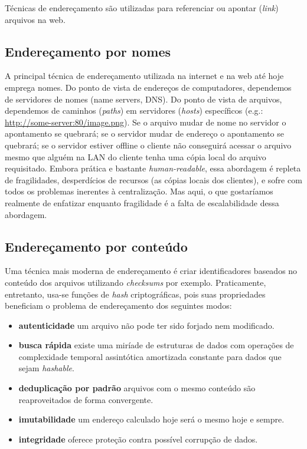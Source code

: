 Técnicas de endereçamento são utilizadas para referenciar ou apontar (\textit{link}) arquivos na web.

\subsection{Endereçamento por nomes}

A principal técnica de endereçamento utilizada na internet e na web até hoje emprega nomes.
Do ponto de vista de endereços de computadores, dependemos de servidores de nomes (name servers, DNS).
Do ponto de vista de arquivos, dependemos de caminhos (\textit{paths}) em servidores (\textit{hosts}) específicos (e.g.: \url{http://some-server:80/image.png}).
Se o arquivo mudar de nome no servidor o apontamento se quebrará; se o servidor mudar de endereço o apontamento se quebrará; se o servidor estiver offline o cliente não conseguirá acessar o arquivo mesmo que alguém na LAN do cliente tenha uma cópia local do arquivo requisitado.
Embora prática e bastante \textit{human-readable}, essa abordagem é repleta de fragilidades, desperdícios de recursos (as cópias locais dos clientes), e sofre com todos os problemas inerentes à centralização. Mas aqui, o que gostaríamos realmente de enfatizar enquanto fragilidade é a falta de escalabilidade dessa abordagem.

\subsection{Endereçamento por conteúdo}

Uma técnica mais moderna de endereçamento é criar identificadores baseados no conteúdo dos arquivos utilizando \textit{checksums} por exemplo.
Praticamente, entretanto, usa-se funções de \textit{hash} criptográficas, pois suas propriedades beneficiam o problema de endereçamento dos seguintes modos:
\begin{itemize}
    \item \textbf{autenticidade} um arquivo não pode ter sido forjado nem modificado.
    \item \textbf{busca rápida} existe uma miríade de estruturas de dados com operações de complexidade temporal assintótica amortizada constante para dados que sejam \textit{hashable}. 
    \item \textbf{deduplicação por padrão} arquivos com o mesmo conteúdo são reaproveitados de forma convergente.
    \item \textbf{imutabilidade} um endereço calculado hoje será o mesmo hoje e sempre.
    \item \textbf{integridade} oferece proteção contra possível corrupção de dados.
\end{itemize}

